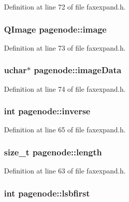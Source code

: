 Definition at line 72 of file faxexpand.\+h.

\hypertarget{classpagenode_a266b69a103ed430ef3a793d134d596d0}{
\subsubsection[{image}]{\setlength{\rightskip}{0pt plus 5cm}Q\+Image pagenode\+::image}}\label{classpagenode_a266b69a103ed430ef3a793d134d596d0}


Definition at line 73 of file faxexpand.\+h.

\hypertarget{classpagenode_a879eb55073bbccadfadc524708452fcc}{
\subsubsection[{image\+Data}]{\setlength{\rightskip}{0pt plus 5cm}uchar$\ast$ pagenode\+::image\+Data}}\label{classpagenode_a879eb55073bbccadfadc524708452fcc}


Definition at line 74 of file faxexpand.\+h.

\hypertarget{classpagenode_a1cfd8455a2333e46d88143d6a54af947}{
\subsubsection[{inverse}]{\setlength{\rightskip}{0pt plus 5cm}int pagenode\+::inverse}}\label{classpagenode_a1cfd8455a2333e46d88143d6a54af947}


Definition at line 65 of file faxexpand.\+h.

\hypertarget{classpagenode_af5305c29fc27e5fe3ebd35d7d72927bb}{
\subsubsection[{length}]{\setlength{\rightskip}{0pt plus 5cm}size\+\_\+t pagenode\+::length}}\label{classpagenode_af5305c29fc27e5fe3ebd35d7d72927bb}


Definition at line 63 of file faxexpand.\+h.

\hypertarget{classpagenode_a9febd846854e535bfe718b166e0ea7e7}{
\subsubsection[{lsbfirst}]{\setlength{\rightskip}{0pt plus 5cm}int pagenode\+::lsbfirst}}\label{classpagenode_a9febd846854e535bfe718b166e0ea7e7}


